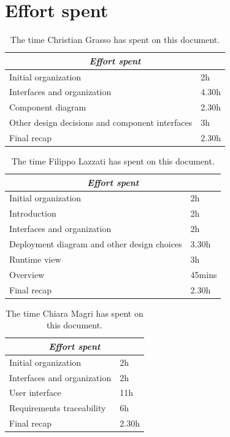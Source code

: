 \documentclass{article}
\begin{document}
\section{Effort spent}
\centering
\begin{longtable}{|m{5cm}|m{5cm}|}
\caption{The time Christian Grasso has spent on this document.}
 \label{christian effort spent}
 \hline
 \multicolumn{2}{|c|}{\cellcolor{white}\emph{Effort spent}} \\
 \endfirsthead
 \endhead
 \endfoot
 \endlastfoot
 \hline
 Initial organization & 2h\\
 \hline
 Interfaces and organization & 4.30h\\
 \hline
 Component diagram & 2.30h\\
 \hline
 Other design decisions and component interfaces & 3h\\
 \hline
 Final recap & 2.30h\\
 \hline
\end{longtable}

\centering
\begin{longtable}{|m{5cm}|m{5cm}|}
\caption{The time Filippo Lazzati has spent on this document.}
 \label{filippo effort spent}
 \hline
 \multicolumn{2}{|c|}{\cellcolor{white}\emph{Effort spent}} \\
 \endfirsthead
 \endhead
 \endfoot
 \endlastfoot
 \hline
 Initial organization & 2h\\
 \hline
 Introduction & 2h\\
 \hline
 Interfaces and organization & 2h\\
 \hline
Deployment diagram and other design choices & 3.30h\\
 \hline
 Runtime view & 3h\\
 \hline
 Overview & 45mins\\
 \hline
  Final recap & 2.30h\\
 \hline
\end{longtable}

\centering
\begin{longtable}{|m{5cm}|m{5cm}|}
\caption{The time Chiara Magri has spent on this document.}
 \label{chiara effort spent}
 \hline
 \multicolumn{2}{|c|}{\cellcolor{white}\emph{Effort spent}} \\
 \endfirsthead
 \endhead
 \endfoot
 \endlastfoot
 \hline
 Initial organization & 2h\\
 \hline
 Interfaces and organization & 2h\\
 \hline
 User interface & 11h\\
\hline
  Requirements traceability & 6h \\
  \hline
  Final recap & 2.30h\\
 \hline
\end{longtable}
\newpage
\end{document}
